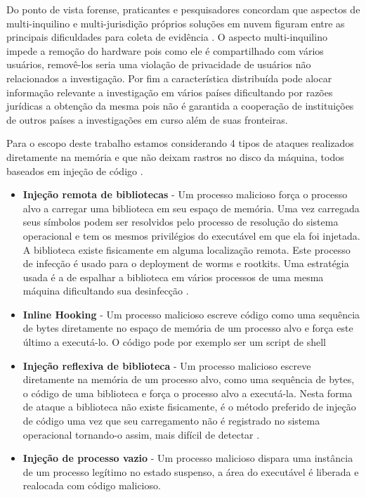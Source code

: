 \documentclass[conference]{IEEEtran}
\begin{document}
Do ponto de vista forense, praticantes e pesquisadores concordam que aspectos de multi-inquilino e multi-jurisdição próprios soluções em nuvem figuram entre as principais 
dificuldades para coleta de evidência \cite{Bash2015a}. O aspecto multi-inquilino impede a remoção do hardware pois como ele é compartilhado com vários usuários, 
removê-los seria uma violação de privacidade de usuários não relacionados a investigação. Por fim a característica distribuída pode alocar informação relevante a 
investigação em vários países dificultando por razões jurídicas a obtenção da mesma \cite{Dykstra2012a} pois não é garantida a cooperação de instituições de outros países a investigações
em curso além de suas fronteiras.

Para o escopo deste trabalho estamos considerando 4 tipos de ataques realizados diretamente na memória e que não deixam rastros no disco da máquina, todos baseados 
em injeção de código \cite{Case2014}.

\begin{itemize}
 \item \textbf{Injeção remota de bibliotecas} - Um processo malicioso força o processo alvo a carregar uma biblioteca em seu espaço de memória. Uma vez carregada seus símbolos
 podem ser resolvidos pelo processo de resolução do sistema operacional e tem os mesmos privilégios do executável em que ela foi injetada. A biblioteca existe fisicamente em 
 alguma localização remota. Este processo de infecção é usado para o deployment de worms e rootkits. Uma estratégia usada é a de espalhar a biblioteca em vários processos
 de uma mesma máquina dificultando sua desinfecção \cite{Miller2004}.
 \item \textbf{Inline Hooking} - Um processo malicioso escreve código como uma sequência de bytes diretamente no espaço de memória de um processo alvo e força este 
 último a executá-lo. O código pode por exemplo ser um script de shell
 \item \textbf{Injeção reflexiva de biblioteca} - Um processo malicioso escreve diretamente na memória de um processo alvo, como uma sequência de bytes, o código de uma biblioteca
 e força o processo alvo a executá-la. Nesta forma de ataque a biblioteca não existe fisicamente, é o método preferido de injeção de código uma vez que seu carregamento não
 é registrado no sistema operacional tornando-o assim, mais difícil de detectar \cite{Fewer2008}.
 \item \textbf{Injeção de processo vazio} - Um processo malicioso dispara uma instância de um processo legítimo no estado suspenso, a área do executável é liberada e realocada com 
 código malicioso.
\end{itemize}
\end{document}
